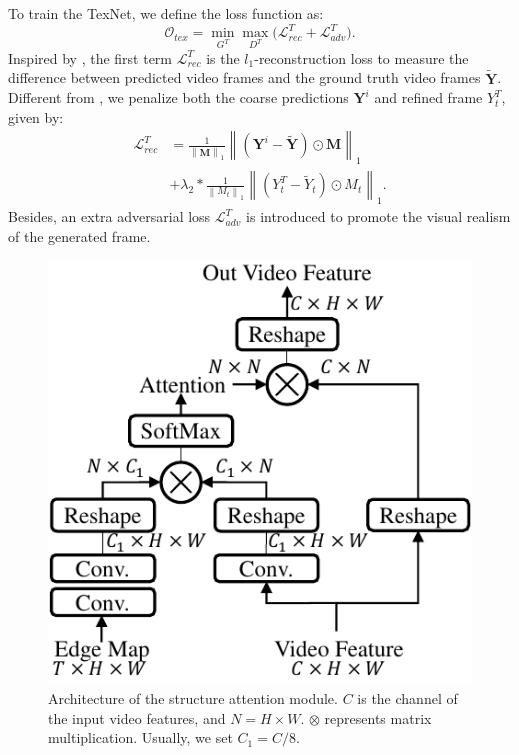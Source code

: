 To train the TexNet, we define the loss function as:
%
\begin{equation}
	\label{eq:1}
		\mathcal{O}_{tex}=\min\limits_{G^T} \max \limits_{D^T} \big(\mathcal{L}^{T}_{rec}+\mathcal{L}^T_{adv}\big).
\end{equation}
%
Inspired by \cite{nazeri2019edgeconnect}, the first term $\mathcal{L}^{T}_{rec}$ is the $l_1$-reconstruction loss to measure the difference between predicted video frames and the ground truth video frames $\widetilde{\boldsymbol{Y}}$.
Different from \cite{nazeri2019edgeconnect}, we penalize both the coarse predictions $\boldsymbol{Y}^i$ and refined frame $Y^{T}_t$, given by:
\begin{equation}
	\begin{aligned}
		\mathcal{L}^{T}_{rec}&=\frac{1}{\left\|\boldsymbol{M} \right\|_1}\left\|(\boldsymbol{Y}^i-\widetilde{\boldsymbol{Y}})\odot \boldsymbol{M}\right\|_1\\ &+\lambda_2*\frac{1}{\left\|M_t \right\|_1}\left\|(Y^T_t-\widetilde{Y}_t)\odot M_t\right\|_1.
	\end{aligned}
\end{equation}
%
%
Besides, an extra adversarial loss $\mathcal{L}^T_{adv}$ is introduced to promote the visual realism of the generated frame.





 \begin{figure}[t]
	\centering
	\includegraphics[width=0.7\columnwidth]{SEM} %
	\caption{Architecture of the structure attention module. $C$ is the channel of the input video features, and $N=H\times W$. $\otimes$ represents matrix multiplication. Usually, we set $C_1=C/8$.}
	\label{SEM}
\end{figure} 


